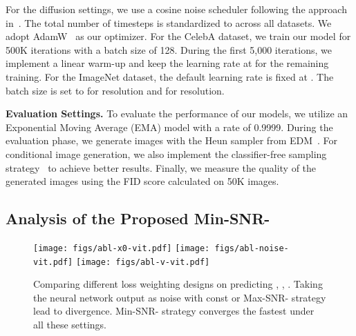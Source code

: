 For the diffusion settings, we use a cosine noise scheduler following the approach in~\cite{nichol2021iddpm,dhariwal2021adm}. The total number of timesteps is standardized to  across all datasets. We adopt AdamW~\cite{2014Adam,2018adamw} as our optimizer. 
For the CelebA dataset, we train our model for 500K iterations with a batch size of 128. During the first 5,000 iterations, we implement a linear warm-up and keep the learning rate at  for the remaining training. 
For the ImageNet dataset, the default learning rate is fixed at . 
The batch size is set to  for  resolution and  for  resolution. 











\noindent \textbf{Evaluation Settings.}\label{sec:evaluation}
To evaluate the performance of our models, we utilize an Exponential Moving Average (EMA) model with a rate of 0.9999. 
During the evaluation phase, we generate images with the Heun sampler from EDM~\cite{karras2022edm}. For conditional image generation, we also implement the classifier-free sampling strategy~\cite{ho2021classifierfree} to achieve better results. Finally, we measure the quality of the generated images using the FID score calculated on 50K images.












\subsection{Analysis of the Proposed Min-SNR- }\label{sec:abalation}



\begin{figure*}[!h]
    \centering
    \texttt{[image: figs/abl-x0-vit.pdf]}
    \texttt{[image: figs/abl-noise-vit.pdf]}
    \texttt{[image: figs/abl-v-vit.pdf]}
    \vspace{-0.8cm}
    \caption{Comparing different loss weighting designs on predicting , , . Taking the neural network output as noise with const or Max-SNR- strategy lead to divergence. Min-SNR- strategy converges the fastest under all these settings.
}
    \label{fig:abl-in256}
\end{figure*}


